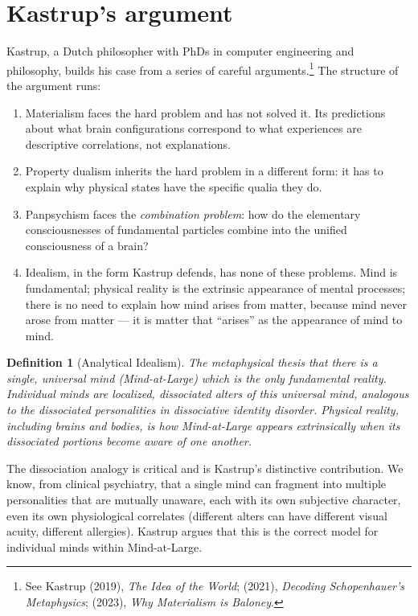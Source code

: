 \documentclass[11pt,a4paper]{book}
\theoremstyle{cleanrm}
\newtheorem{definition}{Definition}[chapter]
\begin{document}
\section{Kastrup's argument}

Kastrup, a Dutch philosopher with PhDs in computer engineering and
philosophy, builds his case from a series of careful arguments.\footnote{See
Kastrup (2019), \emph{The Idea of the World}; (2021), \emph{Decoding
Schopenhauer's Metaphysics}; (2023), \emph{Why Materialism is
Baloney}.} The structure of the argument runs:

\begin{enumerate}[leftmargin=2em]
    \item Materialism faces the hard problem and has not solved it.
    Its predictions about what brain configurations correspond to
    what experiences are descriptive correlations, not explanations.
    \item Property dualism inherits the hard problem in a different
    form: it has to explain why physical states have the specific
    qualia they do.
    \item Panpsychism faces the \emph{combination problem}: how do
    the elementary consciousnesses of fundamental particles combine
    into the unified consciousness of a brain?
    \item Idealism, in the form Kastrup defends, has none of these
    problems. Mind is fundamental; physical reality is the
    extrinsic appearance of mental processes; there is no need to
    explain how mind arises from matter, because mind never arose
    from matter --- it is matter that ``arises'' as the appearance of
    mind to mind.
\end{enumerate}

\begin{definition}[Analytical Idealism]
The metaphysical thesis that there is a single, universal mind
(\emph{Mind-at-Large}) which is the only fundamental reality.
Individual minds are localized, dissociated alters of this universal
mind, analogous to the dissociated personalities in dissociative
identity disorder. Physical reality, including brains and bodies, is
how Mind-at-Large appears extrinsically when its dissociated portions
become aware of one another.
\end{definition}

The dissociation analogy is critical and is Kastrup's distinctive
contribution. We know, from clinical psychiatry, that a single mind
can fragment into multiple personalities that are mutually unaware,
each with its own subjective character, even its own physiological
correlates (different alters can have different visual acuity,
different allergies). Kastrup argues that this is the correct model
for individual minds within Mind-at-Large.
\end{document}
